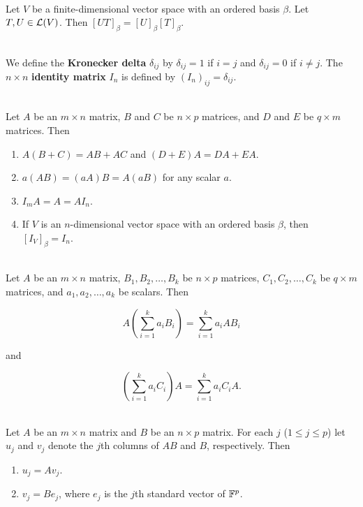 \begin{corollary}
	\hfill\\
	Let $V$ be a finite-dimensional vector space with an ordered basis $\beta$. Let $T, U \in \mathcal{L}(V)$. Then $[UT]_\beta = [U]_\beta [T]_\beta$.
\end{corollary}

\begin{definition}
	\hfill\\
	We define the \textbf{Kronecker delta} $\delta_{ij}$ by $\delta_{ij}=1$ if $i = j$ and $\delta_{ij}=0$ if $i \neq j$. The $n \times n$ \textbf{identity matrix} $I_n$ is defined by $(I_n)_{ij} = \delta_{ij}$.
\end{definition}

\begin{theorem}
	\hfill\\
	Let $A$ be an $m \times n$ matrix, $B$ and $C$ be $n \times p$ matrices, and $D$ and $E$ be $q \times m$ matrices. Then
	
	\begin{enumerate}
		\item $A(B + C) = AB + AC$ and $(D + E)A = DA + EA$.
		\item $a(AB) = (aA)B = A(aB)$ for any scalar $a$.
		\item $I_mA = A = AI_n$.
		\item If $V$ is an $n$-dimensional vector space with an ordered basis $\beta$, then $[I_V]_\beta = I_n$.
	\end{enumerate}
\end{theorem}

\begin{corollary}
	\hfill\\
	Let $A$ be an $m \times n$ matrix, $B_1, B_2, \dots, B_k$ be $n \times p$ matrices, $C_1, C_2, \dots, C_k$ be $q \times m$ matrices, and $a_1, a_2, \dots, a_k$ be scalars. Then
	
	\[A\left(\sum_{i=1}^{k}a_iB_i\right) = \sum_{i=1}^{k}a_iAB_i\]
	
	and
	
	\[\left(\sum_{i=1}^{k}a_iC_i\right)A = \sum_{i=1}^{k}a_iC_iA.\]
\end{corollary}

\begin{theorem}
	\hfill\\
	Let $A$ be an $m \times n$ matrix and $B$ be an $n \times p$ matrix. For each $j$ ($1 \leq j \leq p$) let $u_j$ and $v_j$ denote the $j$th columns of $AB$ and $B$, respectively. Then
	
	\begin{enumerate}
		\item $u_j = Av_j$.
		\item $v_j = Be_j$, where $e_j$ is the $j$th standard vector of $\mathbb{F}^p$.
	\end{enumerate}
\end{theorem}

